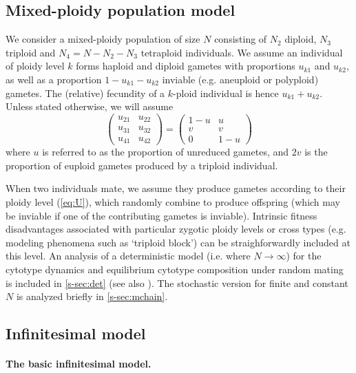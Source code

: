 \documentclass[12pt,a4paper]{article}
\begin{document}
\subsection*{Mixed-ploidy population model}

We consider a mixed-ploidy population of size $N$ consisting of $N_2$ diploid,
$N_3$ triploid and $N_4=N-N_2-N_3$ tetraploid individuals.
We assume an individual of ploidy level $k$ forms haploid and diploid gametes
with proportions $u_{k1}$ and $u_{k2}$, as well as a proportion
$1-u_{k1}-u_{k2}$ inviable (e.g. aneuploid or polyploid) gametes.
The (relative) fecundity of a $k$-ploid individual is hence $u_{k1} + u_{k2}$.
Unless stated otherwise, we will assume 
\begin{equation}
    \begin{pmatrix} 
    u_{21} & u_{22} \\ 
    u_{31} & u_{32} \\ 
    u_{41} & u_{42} 
    \end{pmatrix} =
    \begin{pmatrix} 
    1-u & u \\
    v & v \\
    0 & 1-u
    \end{pmatrix} \label{eq:U}
\end{equation}
where $u$ is referred to as the proportion of unreduced gametes, and $2v$ is
the proportion of euploid gametes produced by a triploid individual.

When two individuals mate, we assume they produce gametes according to their
ploidy level (\cref{eq:U}), which randomly combine to produce offspring (which
may be inviable if one of the contributing gametes is inviable).
Intrinsic fitness disadvantages associated with particular zygotic ploidy
levels or cross types (e.g. modeling phenomena such as `triploid block') can be
straighforwardly included at this level.
An analysis of a deterministic model (i.e. where $N \rightarrow \infty$) for
the cytotype dynamics and equilibrium cytotype composition under random mating
is included in \cref{s-sec:det} (see also \cite{felber1997,kauai2024}).
The stochastic version for finite and constant $N$ is analyzed briefly in
\cref{s-sec:mchain}.

\subsection*{Infinitesimal model}

\paragraph*{The basic infinitesimal model.}
\end{document}

